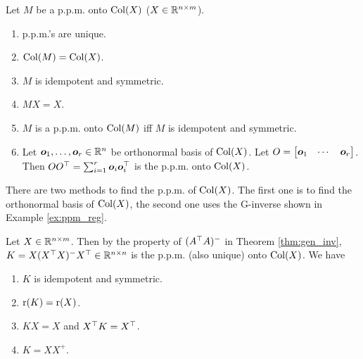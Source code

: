 \documentclass[10pt,a4paper]{book}
\begin{document}
\begin{thmbox}
	\begin{theorem}[Properties of p.p.m.]\label{thm:prop_ppm}
		Let $M$ be a p.p.m. onto $\mathrm{Col}(X)$ ($X\in\mathbb R^{n\times m}$). 
		\begin{enumerate}
			\item p.p.m.'s are unique.
			\item $\mathrm{Col}(M)=\mathrm{Col}(X)$. 
			\item $M$ is idempotent and symmetric.
			\item $MX=X$. 
			\item $M$ is a p.p.m. onto $\mathrm{Col}(M)$ iff $M$ is idempotent and symmetric.
			\item Let ${\boldsymbol o}_1,\ldots,{\boldsymbol o}_r\in\mathbb R^{n}$ be orthonormal basis of $\mathrm{Col}(X)$. Let $O=\begin{bmatrix}
				{\boldsymbol o}_1 & \cdots & {\boldsymbol o}_r
			\end{bmatrix}$. Then $O O^\top=\sum_{i=1}^{r}{\boldsymbol o}_i{\boldsymbol o}_i^\top$ is the p.p.m. onto $\mathrm{Col}(X)$.        
		\end{enumerate}
	\end{theorem}
\end{thmbox}
There are two methods to find the p.p.m. of $\mathrm{Col}(X)$. The first one is to find the orthonormal basis of $\mathrm{Col}(X)$, the second one uses the G-inverse shown in Example \ref{ex:ppm_reg}.  

\begin{exbox}
	\begin{example}\label{ex:ppm_reg}
		Let $X\in\mathbb R^{n\times m}$. Then by the property of $(A^\top A)^{-}$ in Theorem \ref{thm:gen_inv}, $K=X(X^\top X)^{-}X^\top\in\mathbb R^{n\times n}$ is the p.p.m. (also unique) onto $\mathrm{Col}(X)$. 
		We have
		\begin{enumerate}
			\item $K$ is idempotent and symmetric.
			\item $\mathrm{r}(K)=\mathrm{r}(X)$.
			\item $KX=X$ and $X^\top K=X^\top$.  
			\item $K= XX^{+}.$ 
		\end{enumerate}
	\end{example}
\end{exbox}
\end{document}
